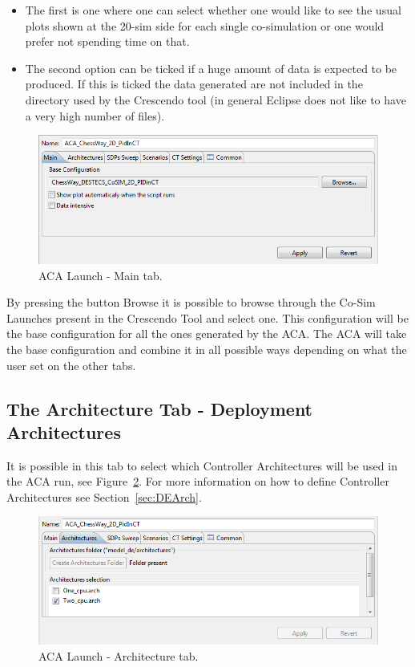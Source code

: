 \documentclass{crescendorepchap}
\begin{document}
\begin{itemize}
\item The first is one where one can select whether one would like to see the usual plots shown at the 20-sim side for each single co-simulation or one would prefer not spending time on that.
\item The second option can be ticked if a huge amount of data is expected to be produced. If this is ticked the data generated are not included in the directory used by the Crescendo tool (in general Eclipse does not like to have a very high number of files). 
\end{itemize}

\begin{figure}[htbp]
\centering
\includegraphics[width=.6\textwidth]{images/Destecsacamaintab.png}
\caption{ACA Launch - Main tab.\label{fig:Destecsacamaintab}}
\end{figure}

By pressing the button Browse it is
possible to browse through the Co-Sim Launches present in the Crescendo
Tool and select one. This configuration will be the base configuration
for all the ones generated by the ACA. The ACA will take the base
configuration and combine it in all possible ways depending on what the
user set on the other tabs.

\subsection{The Architecture Tab - Deployment Architectures}

It is possible in this tab to select which Controller Architectures will
be used in the ACA run, see Figure~\ref{fig:ArchitecturesACA}. For more information on how to define Controller Architectures see Section~\ref{sec:DEArch}.

\begin{figure}[htbp]
\centering
\includegraphics[width=.6\textwidth]{images/ArchitecturesACA.png}
\caption{ACA Launch - Architecture tab.\label{fig:ArchitecturesACA}}
\end{figure}
\end{document}
